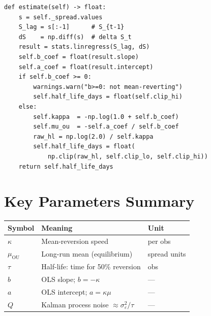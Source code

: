\documentclass[10pt,a4paper,twocolumn]{article}
\begin{document}
\begin{tcolorbox}[codebox={OU OLS Regression}]
\begin{lstlisting}[style=pythonplain]
def estimate(self) -> float:
    s = self._spread.values
    S_lag = s[:-1]      # S_{t-1}
    dS    = np.diff(s)  # delta S_t
    result = stats.linregress(S_lag, dS)
    self.b_coef = float(result.slope)
    self.a_coef = float(result.intercept)
    if self.b_coef >= 0:
        warnings.warn("b>=0: not mean-reverting")
        self.half_life_days = float(self.clip_hi)
    else:
        self.kappa  = -np.log(1.0 + self.b_coef)
        self.mu_ou  = -self.a_coef / self.b_coef
        raw_hl = np.log(2.0) / self.kappa
        self.half_life_days = float(
            np.clip(raw_hl, self.clip_lo, self.clip_hi))
    return self.half_life_days
\end{lstlisting}
\end{tcolorbox}

\section{Key Parameters Summary}

\begin{center}
{\small
\begin{tabular}{@{}p{1.5cm}p{3.2cm}p{1.0cm}@{}}
\toprule
Symbol & Meaning & Unit\\
\midrule
$\kappa$ & Mean-reversion speed & per obs\\
$\mu_{\text{OU}}$ & Long-run mean (equilibrium) & spread units\\
$\tau$ & Half-life: time for 50\% reversion & obs\\
$b$ & OLS slope; $b = -\kappa$ & —\\
$a$ & OLS intercept; $a = \kappa\mu$ & —\\
$Q$ & Kalman process noise $\approx\sigma^2_\varepsilon/\tau$ & —\\
\bottomrule
\end{tabular}
}
\end{center}
\end{document}
